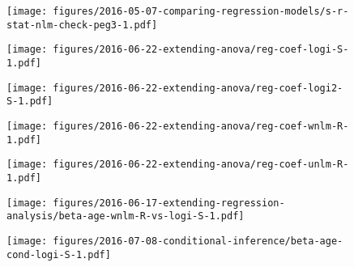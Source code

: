 \documentclass[letterpaper]{article}
\begin{document}
\begin{figure}
\begin{center}
\texttt{[image: figures/2016-05-07-comparing-regression-models/s-r-stat-nlm-check-peg3-1.pdf]}
\end{center}
\caption{}
\label{fig:non-constant-variance}
\end{figure}

\begin{figure}
\begin{center}
\texttt{[image: figures/2016-06-22-extending-anova/reg-coef-logi-S-1.pdf]}
\end{center}
\caption{}
\label{fig:all-effects-logi.S}
\end{figure}

\begin{figure}
\begin{center}
\texttt{[image: figures/2016-06-22-extending-anova/reg-coef-logi2-S-1.pdf]}
\end{center}
\caption{}
\label{fig:all-effects-logi2.S}
\end{figure}

\begin{figure}
\begin{center}
\texttt{[image: figures/2016-06-22-extending-anova/reg-coef-wnlm-R-1.pdf]}
\end{center}
\caption{}
\label{fig:all-effects-wnlm.R}
\end{figure}

\begin{figure}
\begin{center}
\texttt{[image: figures/2016-06-22-extending-anova/reg-coef-unlm-R-1.pdf]}
\end{center}
\caption{}
\label{fig:all-effects-unlm.R}
\end{figure}

\begin{figure}
\begin{center}
\texttt{[image: figures/2016-06-17-extending-regression-analysis/beta-age-wnlm-R-vs-logi-S-1.pdf]}
\end{center}
\caption{}
\label{fig:age-effect-two-model}
\end{figure}

\begin{figure}
\begin{center}
\texttt{[image: figures/2016-07-08-conditional-inference/beta-age-cond-logi-S-1.pdf]}
\end{center}
\caption{}
\label{fig:interaction}
\end{figure}


\setcounter{table}{0}
\makeatletter 
\renewcommand{\thetable}{S\@arabic\c@table}
\makeatother
\end{document}
